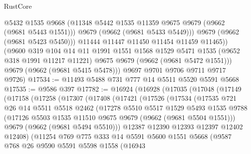 \begin{lexlean}{RustCore}
\begin{coremodule}
                @5432
                @1535
                @9668
                (@11348 @5442 @1535 @11359 @9675 @9679 (@9662 (@9681 @5443 @1551)))
                @9679
                (@9662 (@9681 @5433 @5449)))
              @9679
              (@9662 (@9681 @5423 @5450)))
            @11444
            @11447
            @11450
            @11454
            @11459
            @11465))
        (@9600
          @319
          @104
          @14
          @11
          @1991
          @1551
          @1568
          @1529
          @5471
          @1535
          (@9652 @318 @1991 @11217 @11221)
          @9675
          @9679
          (@9662 (@9681 @5472 @1551)))
        @9679
        (@9662 (@9681 @5415 @5478)))
      @9697
      @9701
      @9706
      @9711
      @9717
      @9726)
@17534 := @11493 @5488 @731 @777 @14 @5511 @5520 @5591 @5668
@17535 := @9586 @397
@17782 := @16924
    (@16928
      (@17035
        (@17048
          (@17149
            (@17158
              (@17258
                (@17307
                  (@17408
                    (@17421
                      (@17526
                        (@17534
                          (@17535
                            @721
                            @26
                            @14
                            @5511
                            @5518
                            @2462
                            (@17278
                              @5510
                              @5517
                              @1529
                              @5493
                              @1535
                              @9788
                              (@17126 @5503 @1535 @11510 @9675 @9679 (@9662 (@9681 @5504 @1551)))
                              @9679
                              (@9662 (@9681 @5494 @5510)))
                            @12387
                            @12390
                            @12393
                            @12397
                            @12402
                            @12408)
                          (@11254
                            @769
                            @775
                            @333
                            @14
                            @5591
                            @5600
                            @1551
                            @5668
                            (@9587
                              @768
                              @26
                              @9590
                              @5591
                              @5598
                              @1558
                              (@16943

\end{coremodule}
\end{lexlean}
